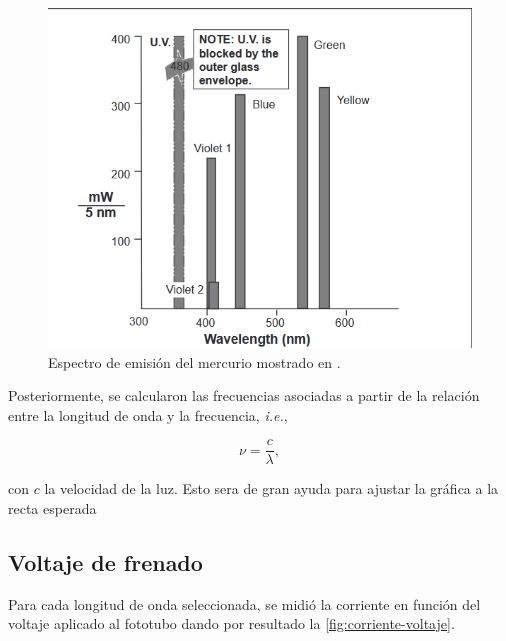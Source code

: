 \documentclass[12pt]{IEEEtran}
\begin{document}
\begin{figure}[htp]
    \centering
    \includegraphics[width=\linewidth, trim={0 0 0.5cm 0.5cm},clip]{espectro-manual}
    \caption{Espectro de emisión del mercurio mostrado en \cite{InstructionSheetPASCO}.}
    \label{fig:espectro-manual}
\end{figure}

Posteriormente, se calcularon las frecuencias asociadas a partir de la relación entre la longitud de onda y la frecuencia, \emph{i.e.},

\begin{equation}
    \nu = \dfrac{c}{\lambda},
\end{equation}

con \(c\) la velocidad de la luz. Esto sera de gran ayuda para ajustar la gráfica a la recta esperada


\subsection{Voltaje de frenado}

Para cada longitud de onda seleccionada, se midió la corriente en función del voltaje aplicado al fototubo dando por resultado la \cref{fig:corriente-voltaje}.
\end{document}
